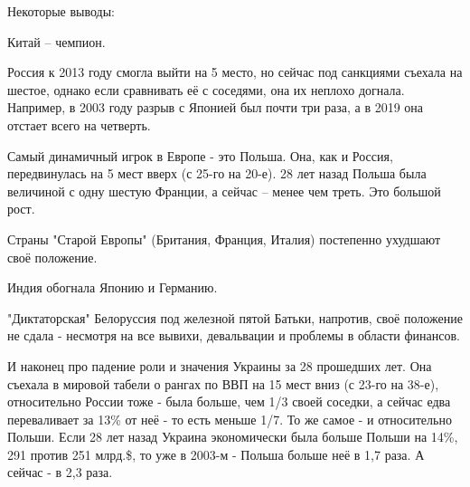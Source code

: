 Некоторые выводы:

Китай – чемпион.

Россия к 2013 году смогла выйти на 5 место, но сейчас под санкциями съехала на
шестое, однако если сравнивать её с соседями, она их неплохо догнала. Например,
в 2003 году разрыв с Японией был почти три раза, а в 2019 она отстает всего на
четверть. 

Самый динамичный игрок в Европе - это Польша. Она, как и Россия, передвинулась
на 5 мест вверх (с 25-го на 20-е). 28 лет назад Польша была величиной с одну
шестую Франции, а сейчас – менее чем треть. Это большой рост.

Страны "Старой Европы" (Британия, Франция, Италия) постепенно ухудшают своё положение.

Индия обогнала Японию и Германию.

"Диктаторская" Белоруссия под железной пятой Батьки, напротив, своё положение
не сдала - несмотря на все вывихи, девальвации и проблемы в области финансов. 

И наконец про падение роли и значения Украины за 28 прошедших лет. Она съехала
в мировой табели о рангах по ВВП на 15 мест вниз (с 23-го на 38-е),
относительно России тоже - была больше, чем 1/3 своей соседки, а сейчас едва
переваливает за 13\% от неё - то есть меньше 1/7. То же самое - и относительно
Польши. Если 28 лет назад Украина экономически была больше Польши на 14\%, 291
против 251 млрд.\$, то уже в 2003-м - Польша больше неё в 1,7 раза. А сейчас - в
2,3 раза.

